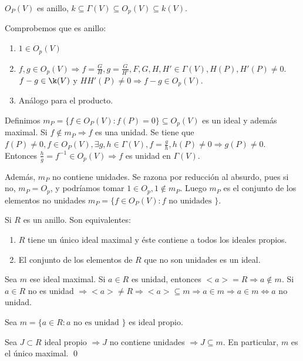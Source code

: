 \begin{nota}
$O_P(V)$ es anillo, $k\subseteq \Gamma(V)\subseteq O_p(V)\subseteq k(V)$.

\vspace{1mm}
Comprobemos que es anillo:
\begin{enumerate}
\item $1\in O_p(V)$
\item $f,g\in O_p(V)\Rightarrow f=\frac{G}{H},g=\frac{G}{H'},F,G,H,H'\in \Gamma(V), H(P),H'(P)\neq 0$. $f-g\in \k(V)$ y $HH'(P)\neq 0 \Rightarrow f-g\in O_p(V)$. 
\item Análogo para el producto.
\end{enumerate}
\end{nota}

Definimos $m_P=\{f\in O_P(V): f(P)=0 \}\subseteq O_p(V)$ es un ideal y además maximal. Si $f\notin m_P \Rightarrow f$ es una unidad. Se tiene que $f(P)\neq 0, f\in O_P(V), \exists g,h\in \Gamma(V), f=\frac{g}{h},h(P)\neq 0 \Rightarrow g(P)\neq 0$. Entonces $\frac{h}{g}=f^{-1}\in  O_p(V) \Rightarrow f$ es unidad en $\Gamma(V)$. 

Además, $m_P$ no contiene unidades. Se razona por reducción al absurdo, pues si no, $m_P=O_p$, y podríamos tomar $1\in O_p, 1\notin m_P$.  Luego $m_P$ es el conjunto de los elementos no unidades $m_P=\{f\in O_P(V): f\text{ no unidades } \}$.

\begin{Prop}
Si $R$ es un anillo. Son equivalentes:

\begin{enumerate}
\item $R$ tiene un único ideal maximal y éste contiene a todos los ideales propios. 
\item El conjunto de los elementos de $R$ que no son unidades es un ideal. 
\end{enumerate}
\end{Prop}

\begin{Dem}
 Sea $m$ ese ideal maximal. Si $a\in R$ es unidad, entonces $<a>=R \Rightarrow a\notin m$. Si $a\in R$ no es unidad $ \Rightarrow <a>\neq R \Rightarrow <a>\subseteq m \Rightarrow a \in m \Rightarrow a\in m \Leftrightarrow a $ no unidad.

 Sea $m=\{a\in R: a \text{ no es unidad }\}$ es ideal propio. 

Sea $J\subset R$ ideal propio $\Rightarrow J$ no contiene unidades $\Rightarrow J\subseteq m$. En particular, $m$ es el único maximal. \qed
\end{Dem}

